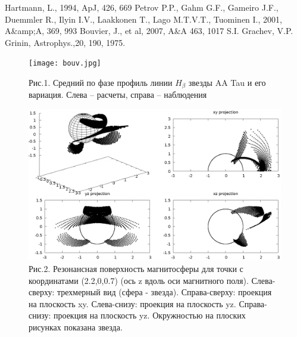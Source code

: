 \documentclass{article}
\begin{document}
\begin{thebibliography}{99}
 Hartmann, L., 1994, ApJ, 426, 669
 Petrov P.P., Gahm G.F., Gameiro J.F., Duemmler R., Ilyin I.V., Laakkonen T., Lago M.T.V.T., Tuominen I., 2001, A\&amp;A, 369, 993
 Bouvier, J., et al, 2007, A\&A 463, 1017
 S.I. Grachev, V.P. Grinin, Astrophys.,20, 190, 1975.
\end{thebibliography}

\begin{figure}[h]
\centering
\texttt{[image: bouv.jpg]}
\caption{Рис.1. Средний по фазе профиль линии $H_\beta$ звезды AA Tau и его вариация. Слева -- расчеты, справа -- наблюдения}
\end{figure}

\begin{figure}[h]
\centering
\includegraphics[width=1.0\textwidth]{surf.eps}
\caption{Рис.2. Резонансная поверхность магнитосферы для точки с координатами (2.2,0,0.7) (ось z вдоль оси магнитного поля). Слева-сверху: трехмерный вид (сфера - звезда). Справа-сверху: проекция на плоскость xy. Слева-снизу: проекция на плоскость yz. Справа-снизу: проекция на плоскость yz. Окружностью на плоских рисунках показана звезда.}
\end{figure}
\end{document}
